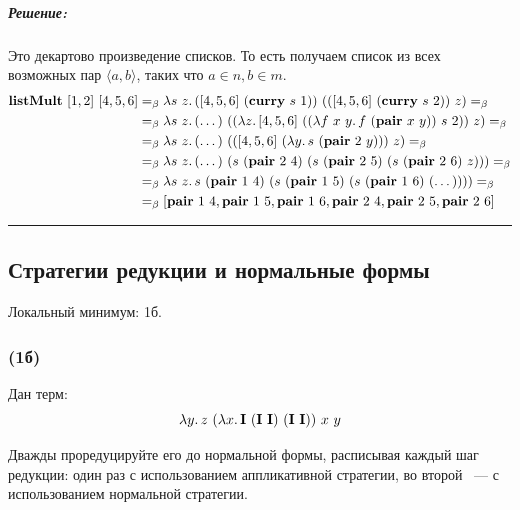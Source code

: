 \documentclass{article}
\newenvironment{proof}{\subparagraph{\hspace{-1em}Решение:\newline}\-}{\par\noindent\rule{\textwidth}{0.4pt}}
\newcommand{\comb}[1]{\mathbf{#1}}
\newcommand{\term}[1]{\mathbf{#1}}
\newcommand{\eqbeta}{=_\beta}
\begin{document}
    \begin{proof}
        Это декартово произведение списков. То есть получаем список из всех возможных пар \(\langle a, b \rangle\), таких что \(a \in n, b \in m\).
        \begin{align}
            \term{listMult}~[1, 2]~[4, 5, 6] & \eqbeta \lambda s~z\ldotp ([4, 5, 6]~(\term{curry}~s~1))~(([4, 5, 6]~(\term{curry}~s~2))~z) \eqbeta \\
                                             & \eqbeta \lambda s~z\ldotp (\dots)~((\lambda z\ldotp [4, 5, 6]~((\lambda f~x~y\ldotp f~(\term{pair}~x~y))~s~2))~z) \eqbeta \\
                                             & \eqbeta \lambda s~z\ldotp (\dots)~(([4, 5, 6]~(\lambda y\ldotp s~(\term{pair}~2~y)))~z) \eqbeta \\
                                             & \eqbeta \lambda s~z\ldotp (\dots)~(s~(\term{pair}~2~4)~(s~(\term{pair}~2~5)~(s~(\term{pair}~2~6)~z))) \eqbeta \\
                                             & \eqbeta \lambda s~z\ldotp s~(\term{pair}~1~4)~(s~(\term{pair}~1~5)~(s~(\term{pair}~1~6)~(\dots)))) \eqbeta \\
                                             & \eqbeta [\term{pair}~1~4, \term{pair}~1~5, \term{pair}~1~6, \term{pair}~2~4, \term{pair}~2~5, \term{pair}~2~6]
        \end{align}
    \end{proof}

    \subsection{Стратегии редукции и нормальные формы}

    Локальный минимум: 1б.

    \subsubsection{(1б)}

    Дан терм:
    \[\lambda y\ldotp z~(\lambda x\ldotp \comb{I}~(\comb{I}~\comb{I})~(\comb{I}~\comb{I}))~x~y\]

    Дважды проредуцируйте его до нормальной формы, расписывая каждый шаг редукции: один раз с использованием аппликативной стратегии, во второй ~--- с
    использованием нормальной стратегии.
\end{document}
